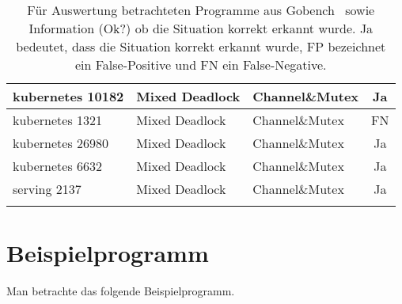 \begin{longtable}[c]{|l|l|l|c|}
  kubernetes 10182      & Mixed Deadlock         & Channel\&Mutex         & Ja                                   \\ \hline
  kubernetes 1321      & Mixed Deadlock         & Channel\&Mutex         & FN                                 \\ \hline
  kubernetes 26980      & Mixed Deadlock         & Channel\&Mutex         & Ja                                   \\ \hline
  kubernetes 6632      & Mixed Deadlock         & Channel\&Mutex         & Ja                                   \\ \hline
  serving 2137      & Mixed Deadlock         & Channel\&Mutex         & Ja                                   \\ \hline
  \caption{Für Auswertung betrachteten 
  Programme aus Gobench~\cite{gobench} sowie 
  Information (Ok?) ob die Situation korrekt erkannt wurde. Ja bedeutet, dass 
  die Situation korrekt erkannt wurde, FP bezeichnet ein False-Positive
  und FN ein False-Negative. }
  \label{App-Goker}
  \end{longtable}


\chapter{Beispielprogramm}\label{Appendix-2}
Man betrachte das folgende Beispielprogramm.
  
% 
% 

